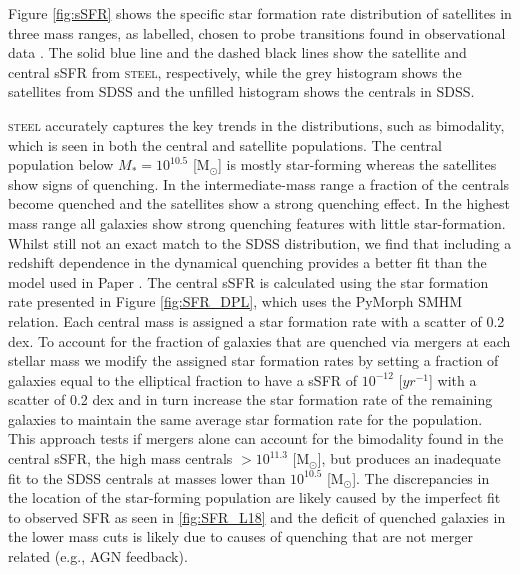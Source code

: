 Figure \ref{fig:sSFR} shows the specific star formation rate distribution of satellites in three mass ranges, as labelled, chosen to probe transitions found in observational data \citep{Bernardi2011EvidenceRelations, Bernardi2014SystematicMorphology, Cappellari2013TheFunction}. The solid blue line and the dashed black lines show the satellite and central sSFR from \textsc{steel}, respectively, while the grey histogram shows the satellites from SDSS and the unfilled histogram shows the centrals in SDSS. 

\textsc{steel} accurately captures the key trends in the distributions, such as bimodality, which is seen in both the central and satellite populations. The central population below $M_{*} = 10^{10.5}$ [M$_{\odot}$] is mostly star-forming whereas the satellites show signs of quenching. In the intermediate-mass range a fraction of the centrals become quenched and the satellites show a strong quenching effect. In the highest mass range all galaxies show strong quenching features with little star-formation. Whilst still not an exact match to the SDSS distribution, we find that including a redshift dependence in the dynamical quenching provides a better fit than the model used in Paper . The central sSFR is calculated using the star formation rate presented in Figure \ref{fig:SFR_DPL}, which uses the PyMorph SMHM relation. Each central mass is assigned a star formation rate with a scatter of 0.2 dex. To account for the fraction of galaxies that are quenched via mergers at each stellar mass we modify the assigned star formation rates by setting a fraction of galaxies equal to the elliptical fraction to have a sSFR of $10^{-12}$ [$yr^{-1}$] with a scatter of 0.2 dex and in turn increase the star formation rate of the remaining galaxies to maintain the same average star formation rate for the population. This approach tests if mergers alone can account for the bimodality found in the central sSFR, the high mass centrals $ > 10^{11.3}$ [M$_{\odot}$], but produces an inadequate fit to the SDSS centrals at masses lower than $10^{10.5}$ [M$_{\odot}$]. The discrepancies in the location of the star-forming population are likely caused by the imperfect fit to observed SFR as seen in \ref{fig:SFR_L18} and the deficit of quenched galaxies in the lower mass cuts is likely due to causes of quenching that are not merger related (e.g., AGN feedback).

